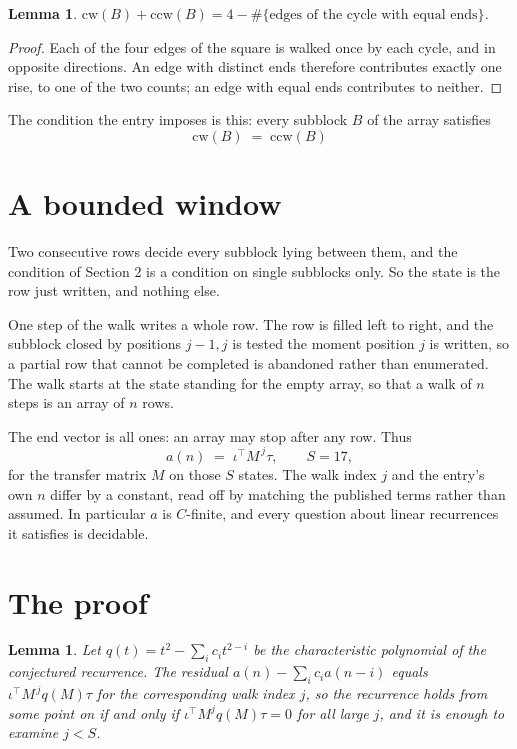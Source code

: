 \documentclass[11pt,a4paper]{article}
\theoremstyle{plain}
\newtheorem{lemma}[theorem]{Lemma}
\theoremstyle{definition}
\begin{document}
\begin{lemma}\label{lem:sum}
$\mathrm{cw}(B)+\mathrm{ccw}(B)=4-\#\{\text{edges of the cycle with equal ends}\}$.
\end{lemma}

\begin{proof}
Each of the four edges of the square is walked once by each cycle, and in opposite directions.
An edge with distinct ends therefore contributes exactly one rise, to one of the two counts;
an edge with equal ends contributes to neither.
\end{proof}

The condition the entry imposes is this: every subblock $B$ of the array satisfies
\[
\mathrm{cw}(B)\;=\;\mathrm{ccw}(B)
\]


\section{A bounded window}

Two consecutive rows decide every subblock lying between them, and the condition of Section 2 is a condition on single subblocks only. So the state is the row just written, and nothing else.

One step of the walk writes a whole row. The row is filled left to right, and the subblock
closed by positions $j-1,j$ is tested the moment position $j$ is written, so a partial row that
cannot be completed is abandoned rather than enumerated. The walk starts at the state standing
for the empty array, so that a walk of $n$ steps is an array of $n$ rows.

The end vector is all ones: an array may stop after any row. Thus
\[
a(n)\;=\;\iota^{\!\top}M^{\,j}\tau ,\qquad S=17,
\]
for the transfer matrix $M$ on those $S$ states. The walk index $j$ and the entry's own $n$
differ by a constant, read off by matching the published terms rather than assumed. In
particular $a$ is $C$-finite, and every question about linear recurrences it satisfies is
decidable.

\section{The proof}

\begin{lemma}\label{lem:crit}
Let $q(t)=t^{2}-\sum_i c_it^{2-i}$ be the characteristic polynomial of the
conjectured recurrence. The residual $a(n)-\sum_ic_ia(n-i)$ equals
$\iota^{\!\top}M^{\,j}q(M)\tau$ for the corresponding walk index $j$, so the recurrence
holds from some point on if and only if $\iota^{\!\top}M^{j}q(M)\tau=0$ for all large $j$,
and it is enough to examine $j<S$.
\end{lemma}
\end{document}
